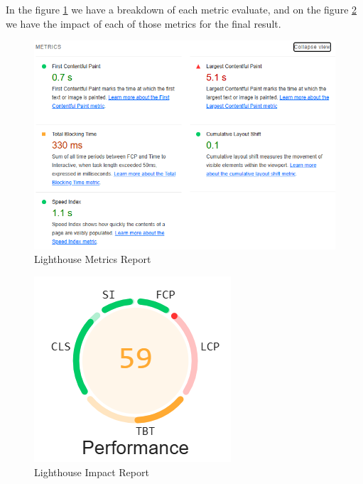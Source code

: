 \documentclass[a4paper,11pt,openright,BCOR=15mm]{scrbook}
\begin{document}
In the figure \ref{fig:LighthouseMetrics} we have a breakdown of each metric evaluate, and on the figure \ref{fig:LighthouseImpact} we have the impact of each of those metrics for the final result.
\begin{figure}[H]
	\centering
	\includegraphics[width=.7\textwidth]{figs/Performance/Frontend/Lighthouse Metrics.png}
	\caption{Lighthouse Metrics Report}
	\label{fig:LighthouseMetrics}
\end{figure}

\begin{figure}[H]
	\centering
	\includegraphics[width=.7\textwidth]{figs/Performance/Frontend/LighthouseImpact.png}
	\caption{Lighthouse Impact Report}
	\label{fig:LighthouseImpact}
\end{figure}
\end{document}
